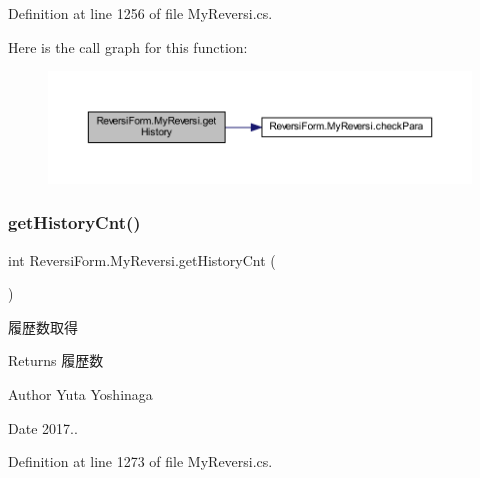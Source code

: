Definition at line 1256 of file My\+Reversi.\+cs.

Here is the call graph for this function\+:
\nopagebreak
\begin{figure}[H]
\begin{center}
\leavevmode
\includegraphics[width=350pt]{class_reversi_form_1_1_my_reversi_a249dba624bda1144c23cc53f68c35c67_cgraph}
\end{center}
\end{figure}
\mbox{\label{class_reversi_form_1_1_my_reversi_a400dc82a921060bfdcf97a5fee721be1}} 
\subsubsection{\texorpdfstring{get\+History\+Cnt()}{getHistoryCnt()}}
{\footnotesize\ttfamily int Reversi\+Form.\+My\+Reversi.\+get\+History\+Cnt (\begin{DoxyParamCaption}{ }\end{DoxyParamCaption})}



履歴数取得 

\begin{DoxyReturn}{Returns}
履歴数 
\end{DoxyReturn}
\begin{DoxyAuthor}{Author}
Yuta Yoshinaga 
\end{DoxyAuthor}
\begin{DoxyDate}{Date}
2017.. 
\end{DoxyDate}


Definition at line 1273 of file My\+Reversi.\+cs.

\mbox{\label{class_reversi_form_1_1_my_reversi_ab6498c154199b58c418af1e0058736f6}} 
